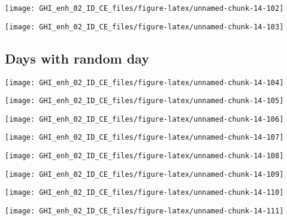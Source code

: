 \documentclass[
  10pt,
  a4paper,oneside]{article}
\begin{document}
\begin{center}\texttt{[image: GHI\_enh\_02\_ID\_CE\_files/figure-latex/unnamed-chunk-14-102]} \end{center}

\begin{center}\texttt{[image: GHI\_enh\_02\_ID\_CE\_files/figure-latex/unnamed-chunk-14-103]} \end{center}

\FloatBarrier

\hypertarget{days-with-random-day}{%
\subsection{Days with random day}\label{days-with-random-day}}

\begin{center}\texttt{[image: GHI\_enh\_02\_ID\_CE\_files/figure-latex/unnamed-chunk-14-104]} \end{center}

\begin{center}\texttt{[image: GHI\_enh\_02\_ID\_CE\_files/figure-latex/unnamed-chunk-14-105]} \end{center}

\begin{center}\texttt{[image: GHI\_enh\_02\_ID\_CE\_files/figure-latex/unnamed-chunk-14-106]} \end{center}

\begin{center}\texttt{[image: GHI\_enh\_02\_ID\_CE\_files/figure-latex/unnamed-chunk-14-107]} \end{center}

\begin{center}\texttt{[image: GHI\_enh\_02\_ID\_CE\_files/figure-latex/unnamed-chunk-14-108]} \end{center}

\begin{center}\texttt{[image: GHI\_enh\_02\_ID\_CE\_files/figure-latex/unnamed-chunk-14-109]} \end{center}

\begin{center}\texttt{[image: GHI\_enh\_02\_ID\_CE\_files/figure-latex/unnamed-chunk-14-110]} \end{center}

\begin{center}\texttt{[image: GHI\_enh\_02\_ID\_CE\_files/figure-latex/unnamed-chunk-14-111]} \end{center}
\end{document}
